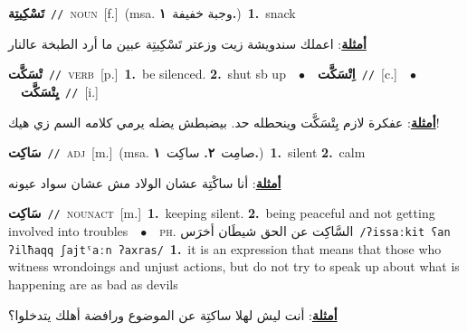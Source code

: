 \documentclass[10pt,a4paper,twoside]{article} %
\begin{document}
\begin{multicols}{2}
{\setlength\topsep{0pt}\textbf{\foreignlanguage{arabic}{تَسْكِيتِة}}\ {\color{gray}\texttt{//}\color{black}}\ \textsc{noun}\ [f.]\ \color{gray}(msa. \foreignlanguage{arabic}{وجبة خفيفة}~\foreignlanguage{arabic}{\textbf{١.}})\color{black}\ \textbf{1.}~snack\  \begin{flushright}\color{gray}\foreignlanguage{arabic}{\textbf{\underline{\foreignlanguage{arabic}{أمثلة}}}: اعملك سندويشة زيت وزعتر تَسْكِيتِة عبين ما أرد الطبخة عالنار}\end{flushright}\color{black}} \vspace{2mm}

{\setlength\topsep{0pt}\textbf{\foreignlanguage{arabic}{تْسَكَّت}}\ {\color{gray}\texttt{//}\color{black}}\ \textsc{verb}\ [p.]\ \textbf{1.}~be silenced.  \textbf{2.}~shut sb up\ \ $\bullet$\ \ \setlength\topsep{0pt}\textbf{\foreignlanguage{arabic}{اِتْسَكَّت}}\ {\color{gray}\texttt{//}\color{black}}\ [c.]\ \ $\bullet$\ \ \setlength\topsep{0pt}\textbf{\foreignlanguage{arabic}{يِتْسَكَّت}}\ {\color{gray}\texttt{//}\color{black}}\ [i.]\  \begin{flushright}\color{gray}\foreignlanguage{arabic}{\textbf{\underline{\foreignlanguage{arabic}{أمثلة}}}: عفكرة لازم يِتْسَكَّت وينحطله حد. بيضبطش يضله يرمي كلامه السم زي هيك!}\end{flushright}\color{black}} \vspace{2mm}

{\setlength\topsep{0pt}\textbf{\foreignlanguage{arabic}{سَاكِت}}\ {\color{gray}\texttt{//}\color{black}}\ \textsc{adj}\ [m.]\ \color{gray}(msa. \foreignlanguage{arabic}{صامِت}~\foreignlanguage{arabic}{\textbf{٢.}}  \foreignlanguage{arabic}{ساكِت}~\foreignlanguage{arabic}{\textbf{١.}})\color{black}\ \textbf{1.}~silent  \textbf{2.}~calm\  \begin{flushright}\color{gray}\foreignlanguage{arabic}{\textbf{\underline{\foreignlanguage{arabic}{أمثلة}}}: أنا ساكْتِة عشان الولاد مش عشان سواد عيونه}\end{flushright}\color{black}} \vspace{2mm}

{\setlength\topsep{0pt}\textbf{\foreignlanguage{arabic}{سَاكِت}}\ {\color{gray}\texttt{//}\color{black}}\ \textsc{noun\textunderscore act}\ [m.]\ \textbf{1.}~keeping silent.  \textbf{2.}~being peaceful and not getting involved into troubles\ \ $\bullet$\ \ \textsc{ph.} \color{gray} \foreignlanguage{arabic}{السَّاكِت عن الحق شيطَان أخرَس}\color{black}\ {\color{gray}\texttt{/{\sffamily ʔissaːkit ʕan ʔilħaqq ʃajtˤaːn ʔaxras}/}\color{black}}\ \textbf{1.}~it is an expression that means that those who witness wrondoings and unjust actions, but do not try to speak up about what is happening are as bad as devils\  \begin{flushright}\color{gray}\foreignlanguage{arabic}{\textbf{\underline{\foreignlanguage{arabic}{أمثلة}}}: أنت ليش لهلا ساكتِة عن الموضوع ورافضة أهلك يتدخلوا؟}\end{flushright}\color{black}} \vspace{2mm}


\end{multicols}
\end{document}
